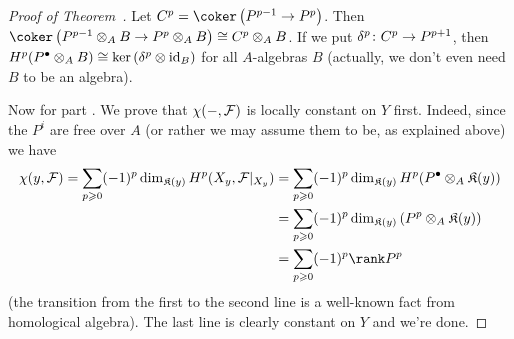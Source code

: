 \documentclass[a4paper,parskip=half,numbers=enddot, DIV=12]{scrreprt}
\renewcommand{\geq}{\geqslant}
\begin{document}
\begin{proof}[Proof of Theorem~]
	Let $C^p=\coker\left(P^{p-1}\morphism P^p\right)$. Then $\coker\left(P^{p-1}\otimes_AB\morphism P^p\otimes_AB\right)\cong C^p\otimes_AB$. If we put $\delta^p\colon C^p\morphism P^{p+1}$, then $H^p(P^\bullet\otimes_AB)\cong \ker\left(\delta^p\otimes\operatorname{id}_B\right)$ for all $A$-algebras $B$ (actually, we don't even need $B$ to be an algebra).
	
	Now for part . We prove that $\chi(-,\mathcal{F})$ is locally constant on $Y$ first. Indeed, since the $P^i$ are free over $A$ (or rather we may assume them to be, as explained above) we have
	\begin{align*}
		\chi(y,\Ff)=\sum_{p\geq 0}(-1)^p\dim_{\KK(y)}H^p(X_y,\Ff|_{X_y})&=\sum_{p\geq 0}(-1)^p\dim_{\KK(y)}H^p(P^\bullet\otimes_A\KK(y))\\
		&=\sum_{p\geq 0}(-1)^p\dim_{\KK(y)}\left(P^p\otimes_A\KK(y)\right)\\
		&=\sum_{p\geq 0}(-1)^p\rank P^p
	\end{align*}
	(the transition from the first to the second line is a well-known fact from homological algebra). The last line is clearly constant on $Y$ and we're done.
	

\end{proof}
\end{document}
